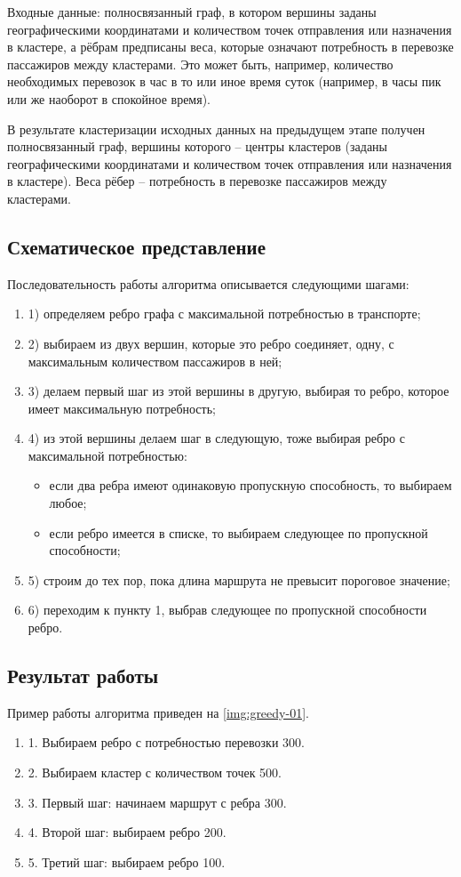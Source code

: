Входные данные: полносвязанный граф, в котором вершины заданы географическими координатами и количеством 
точек отправления или назначения в кластере, а рёбрам предписаны веса, которые означают потребность в 
перевозке пассажиров между кластерами. Это может быть, например, количество необходимых перевозок в час в то 
или иное время суток (например, в часы пик или же наоборот в спокойное время).

В результате кластеризации исходных данных на предыдущем этапе получен полносвязанный граф, вершины 
которого -- центры кластеров (заданы географическими координатами и количеством точек отправления или 
назначения в кластере). Веса рёбер -- потребность в перевозке пассажиров между кластерами. 

\subsection{Схематическое представление}
Последовательность работы алгоритма описывается следующими шагами:
\begin{enumerate}
    \item 1) определяем ребро графа с максимальной потребностью в транспорте;
    \item 2) выбираем из двух вершин, которые это ребро соединяет, одну, с максимальным количеством 
        пассажиров в ней;
    \item 3) делаем первый шаг из этой вершины в другую, выбирая то ребро, которое имеет максимальную 
        потребность;
    \item 4) из этой вершины делаем шаг в следующую, тоже выбирая ребро с максимальной потребностью:
    \begin{itemize}
        \item если два ребра имеют одинаковую пропускную способность, то выбираем любое;
        \item если ребро имеется в списке, то выбираем следующее по пропускной способности;
    \end{itemize}
    \item 5) строим до тех пор, пока длина маршрута не превысит пороговое значение;
    \item 6) переходим к пункту 1, выбрав следующее по пропускной способности ребро.
\end{enumerate}

\subsection{Результат работы}
Пример работы алгоритма приведен на \ref{img:greedy-01}.
\begin{enumerate}
    \item 1. Выбираем ребро с потребностью перевозки 300.
    \item 2. Выбираем кластер с количеством точек 500.
    \item 3. Первый шаг: начинаем маршрут с ребра 300.
    \item 4. Второй шаг: выбираем ребро 200.
    \item 5. Третий шаг: выбираем ребро 100.
\end{enumerate}


